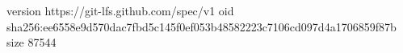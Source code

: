 version https://git-lfs.github.com/spec/v1
oid sha256:ee6558e9d570dac7fbd5c145f0ef053b48582223c7106cd097d4a1706859f87b
size 87544
